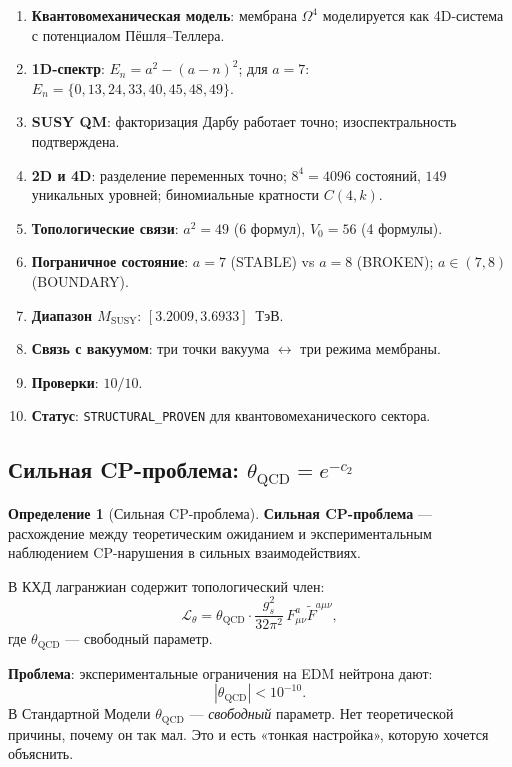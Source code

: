 \documentclass[11pt,a4paper]{article}
\newcommand{\Om}{\ensuremath{\Omega^4}}
\theoremstyle{definition}
\newtheorem{definition}[theorem]{Определение}
\begin{document}
\begin{enumerate}
    \item \textbf{Квантовомеханическая модель}: мембрана $\Om$
          моделируется как 4D-система с потенциалом Пёшля--Теллера.
    \item \textbf{1D-спектр}: $E_n = a^2 - (a-n)^2$;
          для $a = 7$: $E_n = \{0, 13, 24, 33, 40, 45, 48, 49\}$.
    \item \textbf{SUSY QM}: факторизация Дарбу работает точно;
          изоспектральность подтверждена.
    \item \textbf{2D и 4D}: разделение переменных точно;
          $8^4 = 4096$ состояний, $149$ уникальных уровней;
          биномиальные кратности $C(4, k)$.
    \item \textbf{Топологические связи}: $a^2 = 49$ (6 формул),
          $V_0 = 56$ (4 формулы).
    \item \textbf{Пограничное состояние}: $a = 7$ (STABLE) vs
          $a = 8$ (BROKEN); $a \in (7, 8)$ (BOUNDARY).
    \item \textbf{Диапазон $M_{\text{SUSY}}$}:
          $[3.2009, 3.6933]$~ТэВ.
    \item \textbf{Связь с вакуумом}: три точки вакуума
          $\leftrightarrow$ три режима мембраны.
    \item \textbf{Проверки}: $10/10$.
    \item \textbf{Статус}: \texttt{STRUCTURAL\_PROVEN} для
          квантовомеханического сектора.
\end{enumerate}
\subsection{Сильная CP-проблема: \texorpdfstring{$\theta_{\text{QCD}} = e^{-c_2}$}{theta\_QCD = e\^{}-c\_2}}
\label{subsec:strong-cp}

\begin{definition}[Сильная CP-проблема]
\label{def:strong-cp}
\textbf{Сильная CP-проблема} — расхождение между теоретическим ожиданием
и экспериментальным наблюдением CP-нарушения в сильных взаимодействиях.

\medskip\noindent
В КХД лагранжиан содержит топологический член:
\begin{equation}
    \mathcal{L}_{\theta} = \theta_{\text{QCD}} \cdot
    \frac{g_s^2}{32\pi^2} \, F_{\mu\nu}^a \tilde{F}^{a\mu\nu},
    \label{eq:theta-term}
\end{equation}
где $\theta_{\text{QCD}}$ — свободный параметр.

\medskip\noindent
\textbf{Проблема}: экспериментальные ограничения на EDM нейтрона дают:
\begin{equation}
    |\theta_{\text{QCD}}| < 10^{-10}.
    \label{eq:theta-limit}
\end{equation}
В Стандартной Модели $\theta_{\text{QCD}}$ — \emph{свободный} параметр.
Нет теоретической причины, почему он так мал. Это и есть «тонкая
настройка», которую хочется объяснить.
\end{definition}
\end{document}
